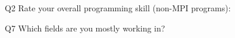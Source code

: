 \begin{description}%
\item{Q2} Rate your overall programming skill (non-MPI programs):%
\item{Q7} Which fields are you mostly working in?%
\end{description}%
